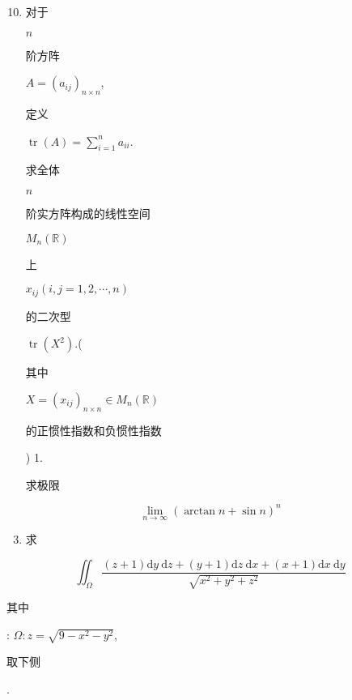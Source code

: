 \documentclass[10pt]{article}
\begin{document}
\begin{enumerate}
  \setcounter{enumi}{9}
  \item \begin{CJK}{UTF8}{mj}对于\end{CJK} $n$ \begin{CJK}{UTF8}{mj}阶方阵\end{CJK} $A=\left(a_{i j}\right)_{n \times n}$, \begin{CJK}{UTF8}{mj}定义\end{CJK} $\operatorname{tr}(A)=\sum_{i=1}^{n} a_{i i}$. \begin{CJK}{UTF8}{mj}求全体\end{CJK} $n$ \begin{CJK}{UTF8}{mj}阶实方阵构成的线性空间\end{CJK} $M_{n}(\mathbb{R})$ \begin{CJK}{UTF8}{mj}上\end{CJK} $x_{i j}(i, j=1,2, \cdots, n)$ \begin{CJK}{UTF8}{mj}的二次型\end{CJK} $\operatorname{tr}\left(X^{2}\right)$.(\begin{CJK}{UTF8}{mj}其中\end{CJK} $X=\left(x_{i j}\right)_{n \times n} \in M_{n}(\mathbb{R})$ \begin{CJK}{UTF8}{mj}的正惯性指数和负惯性指数\end{CJK}) 1.\begin{CJK}{UTF8}{mj}求极限\end{CJK}
\end{enumerate}
$$
\lim _{n \rightarrow \infty}(\arctan n+\sin n)^{n}
$$

\begin{enumerate}
  \setcounter{enumi}{2}
  \item \begin{CJK}{UTF8}{mj}求\end{CJK}
\end{enumerate}
$$
\iint_{\Omega} \frac{(z+1) \mathrm{d} y \mathrm{~d} z+(y+1) \mathrm{d} z \mathrm{~d} x+(x+1) \mathrm{d} x \mathrm{~d} y}{\sqrt{x^{2}+y^{2}+z^{2}}}
$$
\begin{CJK}{UTF8}{mj}其中\end{CJK}: $\Omega: z=\sqrt{9-x^{2}-y^{2}}$, \begin{CJK}{UTF8}{mj}取下侧\end{CJK}.
\end{document}

